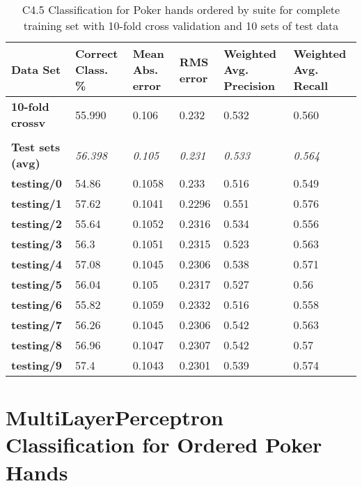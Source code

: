 \documentclass[10pt, a4paper]{article}
\begin{document}
\begin{table}[htbp]
  \centering
  \begin{tabular}{p{3cm}p{1.5cm}p{1.5cm}p{1.5cm}p{1.5cm}p{1.5cm}}
    \toprule
    \textbf{Data Set} & Correct Class. \% & Mean Abs. error & RMS error & Weighted Avg. Precision & Weighted Avg. Recall \\
    \midrule
    \textbf{10-fold crossv} & 55.990 & 0.106 & 0.232 & 0.532 & 0.560 \\
    \textbf{} &       &       &       &       &  \\
    \textbf{Test sets (avg)} & \textit{56.398} & \textit{0.105} & \textit{0.231} & \textit{0.533} & \textit{0.564} \\
    \textbf{   testing/0} & 54.86 & 0.1058 & 0.233 & 0.516 & 0.549 \\
    \textbf{   testing/1} & 57.62 & 0.1041 & 0.2296 & 0.551 & 0.576 \\
    \textbf{   testing/2} & 55.64 & 0.1052 & 0.2316 & 0.534 & 0.556 \\
    \textbf{   testing/3} & 56.3  & 0.1051 & 0.2315 & 0.523 & 0.563 \\
    \textbf{   testing/4} & 57.08 & 0.1045 & 0.2306 & 0.538 & 0.571 \\
    \textbf{   testing/5} & 56.04 & 0.105 & 0.2317 & 0.527 & 0.56 \\
    \textbf{   testing/6} & 55.82 & 0.1059 & 0.2332 & 0.516 & 0.558 \\
    \textbf{   testing/7} & 56.26 & 0.1045 & 0.2306 & 0.542 & 0.563 \\
    \textbf{   testing/8} & 56.96 & 0.1047 & 0.2307 & 0.542 & 0.57 \\
    \textbf{   testing/9} & 57.4  & 0.1043 & 0.2301 & 0.539 & 0.574 \\
    \bottomrule
    \end{tabular}%


	\caption{C4.5 Classification for Poker hands ordered by suite for complete training set with 10-fold cross validation and 10 sets of test data}   
  \label{tab:mlpsresults}%
\end{table}%

\clearpage

\section{MultiLayerPerceptron Classification for Ordered Poker Hands}
\label{app:neural}
\end{document}
